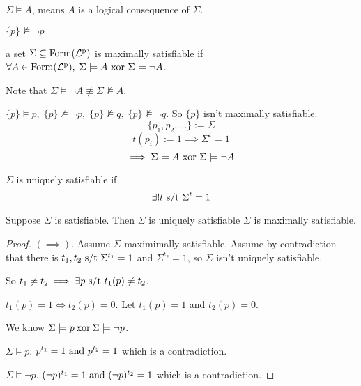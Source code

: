 \documentclass[12pt]{article}
\begin{document}
\bbox
\begin{nota}
  \(\Sigma\models A\), means \(A\) is a logical consequence of \(\Sigma\).
\end{nota}
\ebox

\bboxex
\begin{exam}
  \(\{p\}\not\models\neg p\)
\end{exam}
\ebox

\bbox
\begin{defn}
  a set \(\Sigma\subseteq\mathrm{Form}(\mathrm{\mathcal{L}^p_{}})\) is maximally satisfiable
  if \(\forall A\in\mathrm{Form}(\mathrm{\mathcal{L}^p_{}}),\;\Sigma\models A\text{ xor }\Sigma\models\neg A\).

  Note that \(\Sigma\models\neg A\not\equiv\Sigma\not\models A\).
\end{defn}
\ebox

\bboxex
\begin{exam}
  \(\{p\}\models p,\;\{p\}\not\models\neg p,\;
  \{p\}\not\models q,\;\{p\}\not\models\neg q\). So \(\{p\}\) isn't
  maximally satisfiable.
  \[\{p_1,p_2,\dots\}:=\Sigma\]
  \[t(p_i):=1\implies\Sigma^t=1\]
  \[\implies\Sigma\models A\text{ xor }\Sigma\models\neg A\]
\end{exam}
\ebox

\bbox
\begin{defn}
  \(\Sigma\) is uniquely satisfiable if
  \[
    \exists!t\text{ s/t }\Sigma^t=1
  \]
\end{defn}
\ebox


\bbox
\begin{thm}
  Suppose \(\Sigma\) is satisfiable. Then \(\Sigma\) is 
  uniquely satisfiable  \(\Sigma\) is maximally satisfiable.
\end{thm}
\ebox

\bboxproof
\begin{proof}
  \((\implies)\). Assume \(\Sigma\) maximimally satisfiable. 
  Assume by contradiction that there is \(t_1,t_2\text{ s/t }\Sigma^{t_1}=1\) and
  \(\Sigma^{t_2}=1\), so \(\Sigma\) isn't uniquely satisfiable.

  So \(t_1\neq t_2\implies\exists p\text{ s/t } t_1(p)\neq t_2\).

  \(t_1(p)=1\iff t_2(p)=0\). Let \(t_1(p)=1\) and \(t_2(p)=0\).

  We know \(\Sigma\models p\mathbin{\mathrm{xor}}\Sigma\models\neg p\).

   \(\Sigma\models p\). \(p^{t_1}=1\text{ and }p^{t_2}=1\) which
  is a contradiction.

   \(\Sigma\models\neg p\). \((\neg p)^{t_1}=1\text{ and }(\neg p)^{t_2}=1\)
  which is a contradiction.
\end{proof}
\ebox
\end{document}
